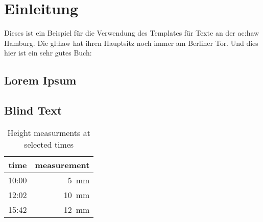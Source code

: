 %


\chapter{Einleitung}
Dieses ist ein Beispiel für die Verwendung des Templates für Texte an der \gls{ac:haw} Hamburg.
Die \gls{gl:haw} hat ihren Hauptsitz noch immer am Berliner Tor.
Und dies hier ist ein sehr gutes Buch: \cite{adams1995douglas}


\section{Lorem Ipsum}
\lipsum


\section{Blind Text}
\blindtext


\blindmathtrue
\blindmathfalse

\begin{table}[ht]
    \caption{Height measurments at selected times}\label{table:measurements}
    \begin{center}
        \begin{tabular}{r|r}
            time  & measurement \\
            \hline
            10:00 & 5~mm        \\
            12:02 & 10~mm       \\
            15:42 & 12~mm       \\
        \end{tabular}
    \end{center}
\end{table}

\lipsum

